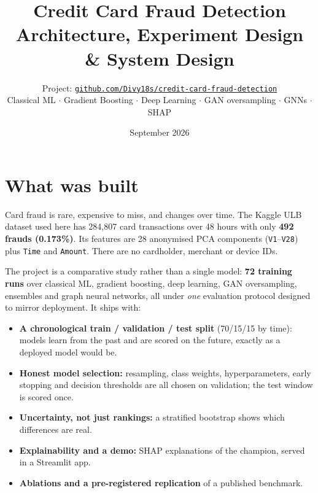 \documentclass[11pt,a4paper]{article}
\title{Credit Card Fraud Detection\\{\large Architecture, Experiment Design \& System Design}}
\author{Project: \href{https://github.com/Divy18s/credit-card-fraud-detection}{\texttt{github.com/Divy18s/credit-card-fraud-detection}}\\
\small Classical ML $\cdot$ Gradient Boosting $\cdot$ Deep Learning $\cdot$ GAN oversampling $\cdot$ GNNs $\cdot$ SHAP}
\date{September 2026}
\begin{document}
\maketitle
\tableofcontents
\newpage

\section{What was built}
Card fraud is rare, expensive to miss, and changes over time. The Kaggle ULB dataset used here has
284,807 card transactions over 48 hours with only \textbf{492 frauds (0.173\%)}. Its features are 28
anonymised PCA components (\texttt{V1}--\texttt{V28}) plus \texttt{Time} and \texttt{Amount}. There
are no cardholder, merchant or device IDs.

The project is a comparative study rather than a single model: \textbf{72 training runs} over
classical ML, gradient boosting, deep learning, GAN oversampling, ensembles and graph neural networks,
all under \emph{one} evaluation protocol designed to mirror deployment. It ships with:
\begin{itemize}[leftmargin=1.0cm]
\item \textbf{A chronological train / validation / test split} (70/15/15 by time): models learn from the
past and are scored on the future, exactly as a deployed model would be.
\item \textbf{Honest model selection:} resampling, class weights, hyperparameters, early stopping and
decision thresholds are all chosen on validation; the test window is scored once.
\item \textbf{Uncertainty, not just rankings:} a stratified bootstrap shows which differences are real.
\item \textbf{Explainability and a demo:} SHAP explanations of the champion, served in a Streamlit app.
\item \textbf{Ablations and a pre-registered replication} of a published benchmark.
\end{itemize}
\end{document}
